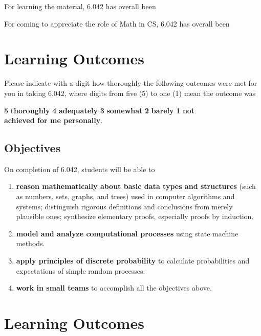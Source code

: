 \documentclass[handout]{mcs}
\begin{document}
For learning the material, 6.042 has overall been  \hfill \brule{0.5in}

For coming to appreciate the role of
Math in CS, 6.042 has overall been \hfill \brule{0.5in}

\section*{Learning Outcomes}

Please indicate with a digit how thoroughly the following outcomes
were met for you in taking 6.042, where digits from five (5) to one
(1) mean the outcome was
\begin{center}
\textbf{5}  \textbf{thoroughly} \qquad
\textbf{4}  \textbf{adequately}\qquad
\textbf{3} \textbf{somewhat}\qquad
\textbf{2} \textbf{barely}\qquad
\textbf{1} \textbf{not}\\

\textbf{achieved for me personally}.
\end{center}

\iffalse

\subsection{Objectives}
On completion of 6.042, students will be able to
\begin{enumerate}
\item
\label{Basic Discrete Mathematics Concepts}
\textbf{reason mathematically about basic data types and structures} (such
as numbers, sets, graphs, and trees) used in computer algorithms and
systems; distinguish rigorous definitions and conclusions from merely
plausible ones; synthesize elementary proofs, especially proofs by
induction.\brule{0.5in}

\item
\label{Computational Processes} 
\textbf{model and analyze computational processes} using state machine
methods.\brule{0.5in}

\item \label{Discrete Probability} \textbf{apply principles of discrete
probability} to calculate probabilities and expectations of simple random
processes.\brule{0.5in}

\item 
\label{teams} 
\textbf{work in small teams} to accomplish all the objectives above.\brule{0.5in}
\end{enumerate}

\section*{Learning Outcomes}
\end{document}
